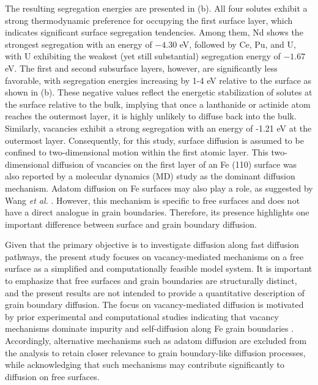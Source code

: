 \documentclass[preprint,12pt]{elsarticle}
\begin{document}
The resulting segregation energies are presented in (b). All four solutes exhibit a strong thermodynamic preference for occupying the first surface layer, which indicates significant surface segregation tendencies. Among them, Nd shows the strongest segregation with an energy of \( -4.30 \) eV, followed by Ce, Pu, and U, with U exhibiting the weakest (yet still substantial) segregation energy of \( -1.67 \) eV.
The first and second subsurface layers, however, are significantly less favorable, with segregation energies increasing by 1-4 eV relative to the surface as shown in (b). These negative values reflect the energetic stabilization of solutes at the surface relative to the bulk, implying that once a lanthanide or actinide atom reaches the outermost layer, it is highly unlikely to diffuse back into the bulk. Similarly, vacancies exhibit a strong segregation with an energy of -1.21 eV at the outermost layer. Consequently, for this study, surface diffusion is assumed to be confined to two-dimensional motion within the first atomic layer. This two-dimensional diffusion of vacancies on the first layer of an Fe (110) surface was also reported by a molecular dynamics (MD) study \cite{wang2010single} as the dominant diffusion mechanism. Adatom diffusion on Fe surfaces may also play a role, as suggested by Wang \textit{et al.} \cite{wang2012molecular}. However, this mechanism is specific to free surfaces and does not have a direct analogue in grain boundaries. Therefore, its presence highlights one important difference between surface and grain boundary diffusion.

Given that the primary objective is to investigate diffusion along fast diffusion pathways, the present study focuses on vacancy-mediated mechanisms on a free surface as a simplified and computationally feasible model system. It is important to emphasize that free surfaces and grain boundaries are structurally distinct, and the present results are not intended to provide a quantitative description of grain boundary diffusion. The focus on vacancy-mediated diffusion is motivated by prior experimental and computational studies indicating that vacancy mechanisms dominate impurity and self-diffusion along Fe grain boundaries \cite{balluffi1982grain,peterson1983grain, klotsman1990impurity, kwok1981, inoue2007grain}. Accordingly, alternative mechanisms such as adatom diffusion are excluded from the analysis to retain closer relevance to grain boundary-like diffusion processes, while acknowledging that such mechanisms may contribute significantly to diffusion on free surfaces.
\end{document}
